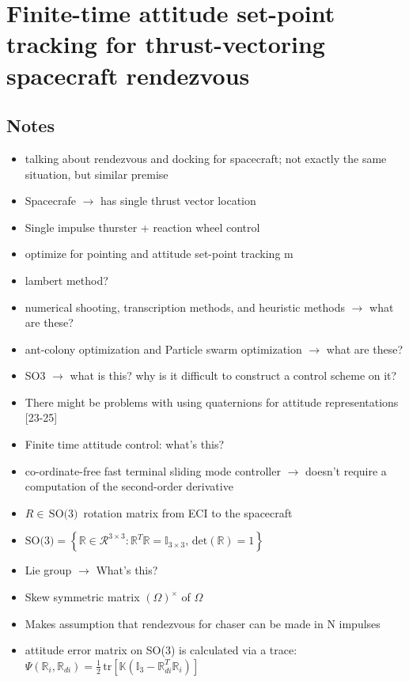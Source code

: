 \documentclass[11pt]{article}
\begin{document}
\section{Finite-time attitude set-point tracking for thrust-vectoring spacecraft rendezvous}
\subsection{Notes}
\begin{itemize}[noitemsep]
    \item talking about rendezvous and docking for spacecraft; not exactly the same situation, but similar premise
    \item Spacecrafe $\rightarrow$ has single thrust vector location
    \item Single impulse thurster + reaction wheel control
    \item optimize for pointing and attitude set-point tracking m
    \item lambert method?
    \item numerical shooting, transcription methods, and heuristic methods $\rightarrow$ what are these?
    \item ant-colony optimization and Particle swarm optimization $\rightarrow$ what are these?
    \item SO3 $\rightarrow$ what is this? why is it difficult to construct a control scheme on it?
    \item There might be problems with using quaternions for attitude representations [23-25]
    \item Finite time attitude control: what's this? 
    \item co-ordinate-free fast terminal sliding mode controller $\rightarrow$ doesn't require a computation of the second-order derivative
    \item $R \in \,\text{SO(3)}\,$  rotation matrix from ECI to the spacecraft
    \item $\text{SO(3)} = \left\{\mathbb{R} \in \mathcal{R}^{3\times 3}: \mathbb{R}^T\mathbb{R} = \mathbb{I}_{3 \times 3}, \,\text{det}(\mathbb{R}) = 1\right\}$
    \item Lie group $\rightarrow$ What's this?
    \item Skew symmetric matrix $(\Omega)^{\times}$ of $\mathbb{\Omega}$
    \item Makes assumption that rendezvous for chaser can be made in N impulses
    \item attitude error matrix on SO(3) is calculated via a trace: $\Psi(\mathbb{R}_i, \mathbb{R}_{di}) = \frac{1}{2}\,\text{tr}\left[\mathbb{K}(\mathbb{I}_3 - \mathbb{R}_{di}^T\mathbb{R}_i)\right]$

\end{itemize}
\end{document}
